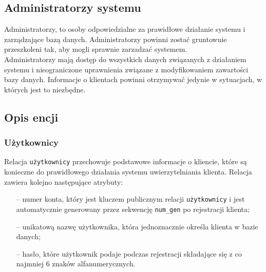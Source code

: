 \documentclass[a4paper,12pt]{article}
\begin{document}
\subsection[Administratorzy systemu]{Administratorzy systemu}
Administratorzy, to osoby odpowiedzialne za prawidłowe działanie systemu i zarządzające bazą danych. 
Administratorzy powinni zostać gruntownie przeszkoleni tak, aby mogli sprawnie
zarzadzać systemem.\\
Administratorzy mają dostęp do wszystkich danych związanych z działaniem systemu i nieograniczone uprawnienia związane
z modyfikowaniem zawartości bazy danych.
Informacje o klientach powinni otrzymywać jedynie w sytuacjach, w których
jest to niezbędne.

\subsection[Opis encji]{Opis encji}
\subsubsection[Użytkownicy]{Użytkownicy}
Relacja \texttt{użytkownicy} przechowuje podstawowe informacje o kliencie, które są konieczne do prawidłowego działania systemu uwierzytelniania klienta. Relacja zawiera kolejno następujące atrybuty:
\begin{itemize}
    \item[--] numer konta, który jest kluczem publicznym relacji \texttt{użytkownicy} i jest automatycznie generowany przez sekwencję \texttt{num\_gen} po rejestracji klienta;
    \item[--] unikatową nazwę użytkownika, która jednoznacznie określa klienta w bazie danych;
    \item[--] hasło, które użytkownik podaje podczas rejestracji składające się z co najmniej 6 znaków alfanumerycznych.
\end{itemize}
\end{document}
